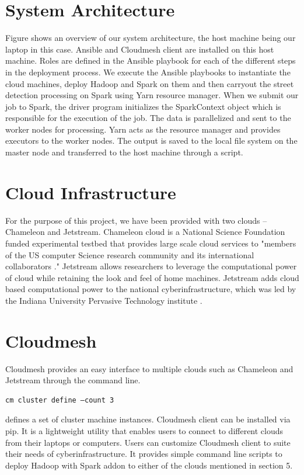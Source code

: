 \documentclass[9pt,twocolumn,twoside]{../../styles/osajnl}
\begin{document}
\section{System Architecture}

Figure shows an overview of our system architecture, the host machine being our laptop in this case. Ansible and Cloudmesh client are installed on this host machine. Roles are defined in the Ansible playbook for each of the different steps in the deployment process. We execute the Ansible playbooks to instantiate the cloud machines, deploy Hadoop and Spark on them and then carryout the street detection processing on Spark using Yarn resource manager. When we submit our job to Spark, the driver program initializes the SparkContext object which is responsible for the execution of the job. The data is parallelized and sent to the worker nodes for processing. Yarn acts as the resource manager and provides executors to the worker nodes. The output is saved to the local file system on the master node and transferred to the host machine through a script.

\section{Cloud Infrastructure}
For the purpose of this project, we have been provided with two clouds – Chameleon and Jetstream. 
Chameleon cloud is a National Science Foundation funded experimental testbed that provides large scale cloud services to "members of the US computer Science research community and its international collaborators \cite{www-chameleon}." Jetstream allows researchers to leverage the computational power of cloud while retaining the look and feel of home machines. Jetstream adds cloud based computational power to the national cyberinfrastructure, which was led by the Indiana University Pervasive Technology institute \cite{www-jetstream}.

\section{Cloudmesh}
Cloudmesh provides an easy interface to multiple clouds such as Chameleon and Jetstream through the command line.  
\begin{verbatim} 
cm cluster define –count 3 
\end{verbatim} 
defines a set of cluster machine instances. 
Cloudmesh client can be installed via pip. It is a lightweight utility that enables users to connect to different clouds from their laptops or computers. Users can customize Cloudmesh client to suite their needs of cyberinfrastructure. It provides simple command line scripts to deploy Hadoop with Spark addon to either of the clouds mentioned in section 5. 
\end{document}
